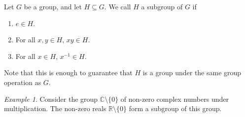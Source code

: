 \documentclass[11pt]{article}
\newcommand{\C}{\mathbb{C}}
\newcommand{\R}{\mathbb{R}}
\theoremstyle{definition}
\theoremstyle{remark}
\newtheorem*{example}{Example}
\numberwithin{equation}{section}
\begin{document}
    \begin{definition}
        Let $G$ be a group, and let $H \subseteq G$. We call $H$ a subgroup of $G$ if
        \begin{enumerate}
        \itemsep0em
            \item $e \in H$.
            \item For all $x, y \in H$, $xy \in H$.
            \item For all $x \in H$, $x^{-1} \in H$.
        \end{enumerate}
        Note that this is enough to guarantee that $H$ is a group under the same
        group operation as $G$.
    \end{definition}
    \begin{example}
        Consider the group $\C\setminus\{0\}$ of non-zero complex numbers under
        multiplication. The non-zero reals $\R\setminus\{0\}$ form a subgroup of this
        group.
    \end{example}
\end{document}
